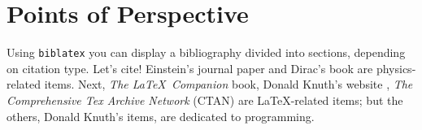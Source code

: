 \chapter{Points of Perspective}

Using \texttt{biblatex} you can display a bibliography divided into sections,  depending on citation type. Let's cite! Einstein's journal paper \cite{einstein} and Dirac's book \cite{dirac} are physics-related items. Next, \textit{The \LaTeX\ Companion} book, Donald Knuth's website \cite{knuthwebsite}, \textit{The Comprehensive Tex Archive Network} (CTAN) are \LaTeX-related items; but the others, Donald Knuth's items, \cite{knuth-fa} are dedicated to programming.
